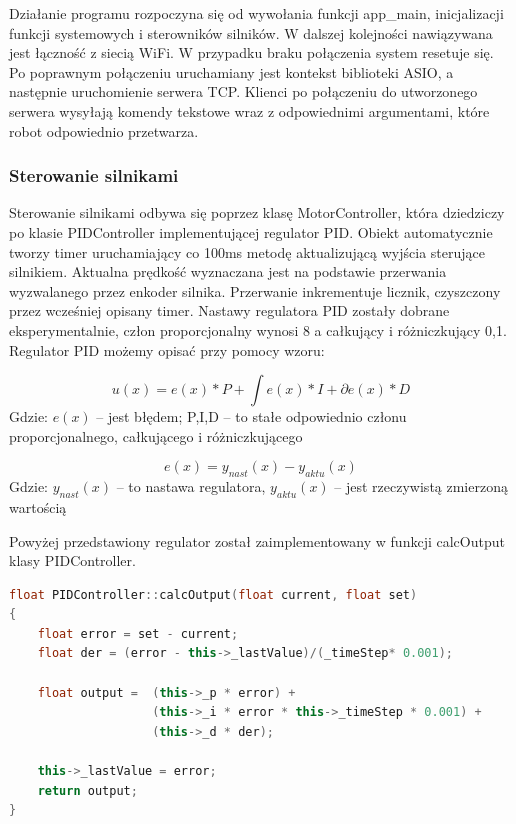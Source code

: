 Działanie programu rozpoczyna się od wywołania funkcji app\_main, inicjalizacji funkcji systemowych i sterowników silników.
W dalszej kolejności nawiązywana jest łączność z siecią WiFi. W przypadku braku połączenia system resetuje się. 
Po poprawnym połączeniu uruchamiany jest kontekst biblioteki ASIO, a następnie uruchomienie serwera TCP.
Klienci po połączeniu do utworzonego serwera wysyłają komendy tekstowe wraz z odpowiednimi argumentami, które
robot odpowiednio przetwarza. 

\subsubsection{Sterowanie silnikami}
Sterowanie silnikami odbywa się poprzez klasę MotorController, która dziedziczy po klasie PIDController implementującej regulator PID.
Obiekt automatycznie tworzy timer uruchamiający co 100ms metodę aktualizującą wyjścia sterujące silnikiem. 
Aktualna prędkość wyznaczana jest na podstawie przerwania wyzwalanego przez enkoder silnika. Przerwanie inkrementuje licznik, 
czyszczony przez wcześniej opisany timer. Nastawy regulatora PID zostały dobrane eksperymentalnie, człon proporcjonalny wynosi 8 a całkujący i różniczkujący 0,1. 
Regulator PID możemy opisać przy pomocy wzoru:

\begin{equation}
	u(x) = e(x) * P + \int{e(x)} * I + \partial{e(x)} * D 
	\label{Eq:PID}
\end{equation}
Gdzie: $e(x)$ -- jest błędem; P,I,D -- to stałe odpowiednio członu proporcjonalnego, całkującego i różniczkującego

\begin{equation}
	e(x) = y_{nast}(x) - y_{aktu}(x)
	\label{Eq:blad}
\end{equation}
Gdzie: $y_{nast}(x)$ -- to nastawa regulatora, $y_{aktu}(x)$ -- jest rzeczywistą zmierzoną wartością
 
Powyżej przedstawiony regulator został zaimplementowany w funkcji calcOutput klasy PIDController.

\begin{lstlisting}[language=C++,caption=Zaimplementowany w C++ regulator PID,label={kodCPPPIDOutput}]
float PIDController::calcOutput(float current, float set)
{
	float error = set - current;
	float der = (error - this->_lastValue)/(_timeStep* 0.001);
	
	float output =  (this->_p * error) + 
					(this->_i * error * this->_timeStep * 0.001) + 
					(this->_d * der);

	this->_lastValue = error;
	return output;
}
\end{lstlisting}

